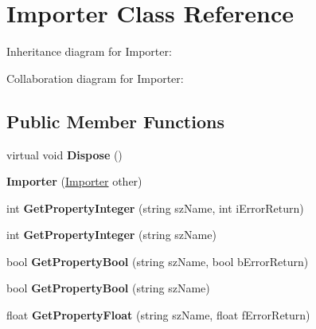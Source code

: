 \hypertarget{class_importer}{\section{Importer Class Reference}
\label{class_importer}
}


Inheritance diagram for Importer\+:


Collaboration diagram for Importer\+:
\subsection*{Public Member Functions}
\begin{DoxyCompactItemize}
\item 
\hypertarget{class_importer_a0c45ae0edb304d088b3d1a46a6441445}{virtual void {\bfseries Dispose} ()}\label{class_importer_a0c45ae0edb304d088b3d1a46a6441445}

\item 
\hypertarget{class_importer_a85103dfb18f5a62f6d3a7d8faecadc92}{{\bfseries Importer} (\hyperlink{class_importer}{Importer} other)}\label{class_importer_a85103dfb18f5a62f6d3a7d8faecadc92}

\item 
\hypertarget{class_importer_a4c386c1d01a3f8e29287fae5c983c28c}{int {\bfseries Get\+Property\+Integer} (string sz\+Name, int i\+Error\+Return)}\label{class_importer_a4c386c1d01a3f8e29287fae5c983c28c}

\item 
\hypertarget{class_importer_ac2092093176c38636b03354c96c8ed16}{int {\bfseries Get\+Property\+Integer} (string sz\+Name)}\label{class_importer_ac2092093176c38636b03354c96c8ed16}

\item 
\hypertarget{class_importer_a1477f403af691b265d5d9e6c991fd0ef}{bool {\bfseries Get\+Property\+Bool} (string sz\+Name, bool b\+Error\+Return)}\label{class_importer_a1477f403af691b265d5d9e6c991fd0ef}

\item 
\hypertarget{class_importer_a4ddcc63c8da26201b0530ae6643dff20}{bool {\bfseries Get\+Property\+Bool} (string sz\+Name)}\label{class_importer_a4ddcc63c8da26201b0530ae6643dff20}

\item 
\hypertarget{class_importer_a442f97fd3ca64ed0b3b95ccb6b2b3507}{float {\bfseries Get\+Property\+Float} (string sz\+Name, float f\+Error\+Return)}\label{class_importer_a442f97fd3ca64ed0b3b95ccb6b2b3507}


\end{DoxyCompactItemize}
